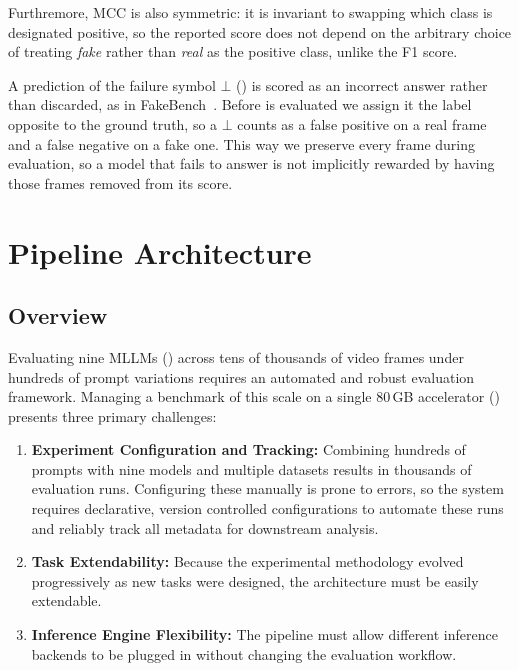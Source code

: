 Furthremore, MCC is also symmetric: it is invariant to swapping which class is designated positive, so the reported score does not depend on the arbitrary choice of treating \emph{fake} rather than \emph{real} as the positive class, unlike the F1 score.

A prediction of the failure symbol $\bot$ () is scored as an incorrect answer rather than discarded, as in FakeBench~\cite{fakebench}. Before  is evaluated we assign it the label opposite to the ground truth, so a $\bot$ counts as a false positive on a real frame and a false negative on a fake one. This way we preserve every frame during evaluation, so a model that fails to answer is not implicitly rewarded by having those frames removed from its score.

\section{Pipeline Architecture}
\label{sec:pipeline}

\subsection{Overview}
\label{subsec:pipeline_overview}

Evaluating nine MLLMs () across tens of thousands of video frames under hundreds of prompt variations requires an automated and robust evaluation framework. Managing a benchmark of this scale on a single 80\,GB accelerator () presents three primary challenges:
\begin{enumerate}
    \item \textbf{Experiment Configuration and Tracking:} Combining hundreds of prompts with nine models and multiple datasets results in thousands of evaluation runs. Configuring these manually is prone to errors, so the system requires declarative, version controlled configurations to automate these runs and reliably track all metadata for downstream analysis.
    \item \textbf{Task Extendability:} Because the experimental methodology evolved progressively as new tasks were designed, the architecture must be easily extendable.
    \item \textbf{Inference Engine Flexibility:} The pipeline must allow different inference backends to be plugged in without changing the evaluation workflow.
\end{enumerate}

